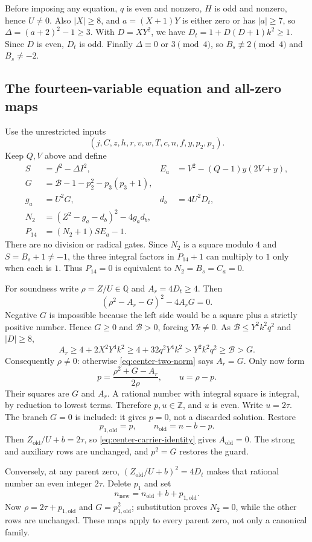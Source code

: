 Before imposing any equation, $q$ is even and nonzero, $H$ is odd and
nonzero, hence $U\ne0$. Also $|X|\ge8$, and $a=(X+1)Y$ is either zero or
has $|a|\ge7$, so $\Delta=(a+2)^2-1\ge3$. With $D=XY^2$, we have
$D_t=1+D(D+1)k^2\ge1$. Since $D$ is even, $D_t$ is odd. Finally
$\Delta\equiv0$ or $3\pmod4$, so $B_s\not\equiv2\pmod4$ and $B_s\ne-2$.

\subsection{The fourteen-variable equation and all-zero maps}
Use the unrestricted inputs
\[
 (j,C,z,h,r,v,w,T,c,n,f,y,p_2,p_3).
\]
Keep $Q,V$ above and define
\begin{align*}
 S&=f^2-\Delta I^2,&E_a&=V^2-(Q-1)y(2V+y),\\
 G&=\mathcal B-1-p_2^2-p_3(p_3+1),\\
 g_a&=U^2G,&d_b&=4U^2D_t,\\
 N_2&=(Z^2-g_a-d_b)^2-4g_ad_b,\\
 P_{14}&=(N_2+1)S E_a-1.
\end{align*}
There are no division or radical gates. Since $N_2$ is a square modulo $4$
and $S=B_s+1\ne-1$, the three integral factors in $P_{14}+1$ can multiply
to $1$ only when each is $1$. Thus $P_{14}=0$ is equivalent to
$N_2=B_s=C_a=0$.

For soundness write $\rho=Z/U\in\mathbb Q$ and $A_r=4D_t\ge4$. Then
\begin{equation}\label{eq:center-two-norm}
 (\rho^2-A_r-G)^2-4A_rG=0.
\end{equation}
Negative $G$ is impossible because the left side would be a square plus a
strictly positive number. Hence $G\ge0$ and $\mathcal B>0$, forcing
$Yk\ne0$. As $\mathcal B\le Y^2k^2q^2$ and $|D|\ge8$,
\[
 A_r\ge4+2X^2Y^4k^2\ge4+32q^2Y^4k^2
       >Y^2k^2q^2\ge\mathcal B>G.
\]
Consequently $\rho\ne0$: otherwise \eqref{eq:center-two-norm} says
$A_r=G$. Only now form
\[
 p=\frac{\rho^2+G-A_r}{2\rho},\qquad u=\rho-p.
\]
Their squares are $G$ and $A_r$. A rational number with integral square is
integral, by reduction to lowest terms. Therefore $p,u\in\mathbb Z$, and
$u$ is even. Write $u=2\tau$. The branch $G=0$ is included: it gives
$p=0$, not a discarded solution. Restore
\[
 p_{1,\mathrm{old}}=p,\qquad n_{\mathrm{old}}=n-b-p.
\]
Then $Z_{\mathrm{old}}/U+b=2\tau$, so
\eqref{eq:center-carrier-identity} gives $A_{\mathrm{old}}=0$.
The strong and auxiliary rows are unchanged, and $p^2=G$ restores the guard.

Conversely, at any parent zero,
$(Z_{\mathrm{old}}/U+b)^2=4D_t$ makes that rational number an even integer
$2\tau$. Delete $p_1$ and set
\[
 n_{\mathrm{new}}=n_{\mathrm{old}}+b+p_{1,\mathrm{old}}.
\]
Now $\rho=2\tau+p_{1,\mathrm{old}}$ and $G=p_{1,\mathrm{old}}^2$;
substitution proves $N_2=0$, while the other rows are unchanged. These maps
apply to every parent zero, not only a canonical family.

